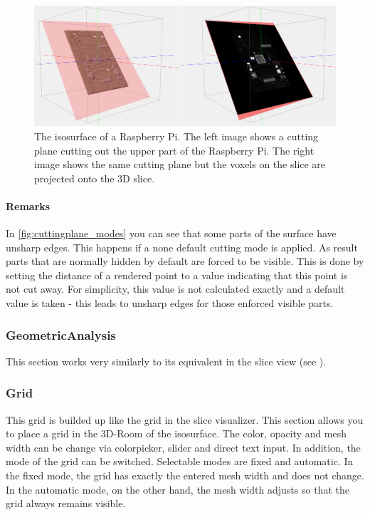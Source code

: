 \begin{figure}[h!]
  \centering
  \includegraphics[width=1.0\textwidth]{img/iso_voxel_slice.png}
  \caption{The isosurface of a Raspberry Pi.\newline
  The left image shows a cutting plane cutting out the upper part of the Raspberry Pi.\newline
  The right image shows the same cutting plane but the voxels on the slice are projected onto the 3D slice.}
  \label{fig:iso_voxel_slice}
\end{figure}

\paragraph{Remarks}
In \autoref{fig:cuttingplane_modes} you can see that some parts of the surface have unsharp edges. This happens if a none default cutting mode
is applied. As result parts that are normally hidden by default are forced to be visible. This is done by setting the distance of a rendered point
to a value indicating that this point is not cut away. For simplicity, this value is not calculated exactly and a default value is taken - this leads to unsharp
edges for those enforced visible parts.

\subsubsection{GeometricAnalysis}
This section works very similarly to its equivalent in the slice view (see ).

\subsubsection{Grid}

This grid is builded up like the grid in the slice visualizer. This section allows you to place a grid in the 3D-Room of the isosurface. The color, opacity and mesh width can be change via colorpicker, slider and direct text input. In addition, the mode of the grid can be switched. Selectable modes are fixed and automatic. In the fixed mode, the grid has exactly the entered mesh width and does not change. In the automatic mode, on the other hand, the mesh width adjusts so that the grid always remains visible.


